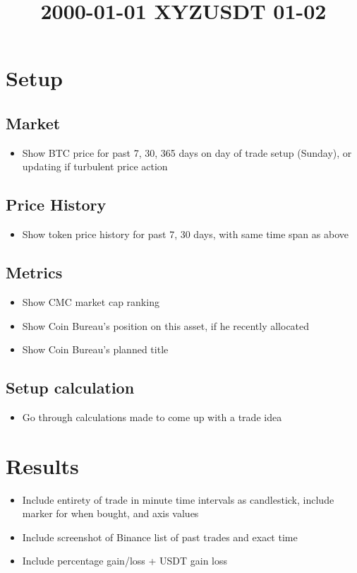 \documentclass{trade}
\title{2000-01-01 XYZUSDT 01-02}
\begin{document}
\maketitle

\section{Setup}
\subsection{Market}
\begin{itemize}
    \item Show BTC price for past 7, 30, 365 days on day of trade setup (Sunday), or updating if turbulent price action
\end{itemize}

\subsection{Price History}
\begin{itemize}
    \item Show token price history for past 7, 30 days, with same time span as above
\end{itemize}

\subsection{Metrics}
\begin{itemize}
    \item Show CMC market cap ranking
    \item Show Coin Bureau's position on this asset, if he recently allocated
    \item Show Coin Bureau's planned title
\end{itemize}

\subsection{Setup calculation}
\begin{itemize}
    \item Go through calculations made to come up with a trade idea
\end{itemize}

\section{Results}
\begin{itemize}
    \item Include entirety of trade in minute time intervals as candlestick, include marker for when bought, and axis values
    \item Include screenshot of Binance list of past trades and exact time
    \item Include percentage gain/loss + USDT gain loss
\end{itemize}
\end{document}
